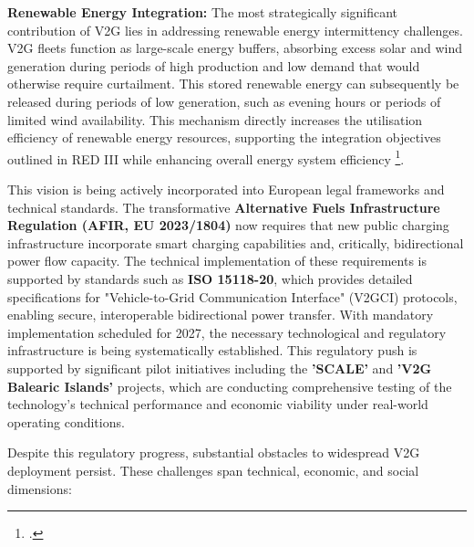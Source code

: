     \noindent
  \textbf{Renewable Energy Integration:} The most strategically significant contribution of V2G lies in addressing renewable energy intermittency challenges. V2G fleets function as large-scale energy buffers, absorbing excess solar and wind generation during periods of high production and low demand that would otherwise require curtailment. This stored renewable energy can subsequently be released during periods of low generation, such as evening hours or periods of limited wind availability. This mechanism directly increases the utilisation efficiency of renewable energy resources, supporting the integration objectives outlined in RED III while enhancing overall energy system efficiency \footcite{khan2024review, zou2021deep}.

\noindent
This vision is being actively incorporated into European legal frameworks and technical standards. The transformative \textbf{Alternative Fuels Infrastructure Regulation (AFIR, EU 2023/1804)} now requires that new public charging infrastructure incorporate smart charging capabilities and, critically, bidirectional power flow capacity. The technical implementation of these requirements is supported by standards such as \textbf{ISO 15118-20}, which provides detailed specifications for "Vehicle-to-Grid Communication Interface" (V2GCI) protocols, enabling secure, interoperable bidirectional power transfer. With mandatory implementation scheduled for 2027, the necessary technological and regulatory infrastructure is being systematically established. This regulatory push is supported by significant pilot initiatives including the \textbf{'SCALE'} and \textbf{'V2G Balearic Islands'} projects, which are conducting comprehensive testing of the technology's technical performance and economic viability under real-world operating conditions.

\noindent
Despite this regulatory progress, substantial obstacles to widespread V2G deployment persist. These challenges span technical, economic, and social dimensions:

